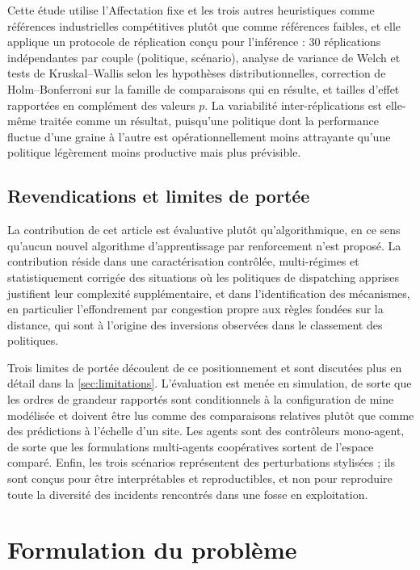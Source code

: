 \documentclass[11pt,a4paper]{article}
\begin{document}
Cette étude utilise l'Affectation fixe et les trois autres heuristiques comme références industrielles compétitives plutôt que comme références faibles, et elle applique un protocole de réplication conçu pour l'inférence : 30 réplications indépendantes par couple (politique, scénario), analyse de variance de Welch et tests de Kruskal--Wallis selon les hypothèses distributionnelles, correction de Holm--Bonferroni sur la famille de comparaisons qui en résulte, et tailles d'effet rapportées en complément des valeurs $p$. La variabilité inter-réplications est elle-même traitée comme un résultat, puisqu'une politique dont la performance fluctue d'une graine à l'autre est opérationnellement moins attrayante qu'une politique légèrement moins productive mais plus prévisible.

\subsection{Revendications et limites de portée}

La contribution de cet article est évaluative plutôt qu'algorithmique, en ce sens qu'aucun nouvel algorithme d'apprentissage par renforcement n'est proposé. La contribution réside dans une caractérisation contrôlée, multi-régimes et statistiquement corrigée des situations où les politiques de dispatching apprises justifient leur complexité supplémentaire, et dans l'identification des mécanismes, en particulier l'effondrement par congestion propre aux règles fondées sur la distance, qui sont à l'origine des inversions observées dans le classement des politiques.

Trois limites de portée découlent de ce positionnement et sont discutées plus en détail dans la \cref{sec:limitations}. L'évaluation est menée en simulation, de sorte que les ordres de grandeur rapportés sont conditionnels à la configuration de mine modélisée et doivent être lus comme des comparaisons relatives plutôt que comme des prédictions à l'échelle d'un site. Les agents sont des contrôleurs mono-agent, de sorte que les formulations multi-agents coopératives \cite{Zhao2025} sortent de l'espace comparé. Enfin, les trois scénarios représentent des perturbations stylisées ; ils sont conçus pour être interprétables et reproductibles, et non pour reproduire toute la diversité des incidents rencontrés dans une fosse en exploitation.
\section{Formulation du problème}
\label{sec:formulation}
\end{document}
